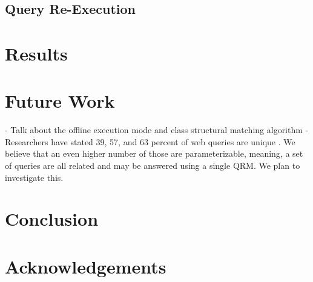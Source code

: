 \documentclass{www2010-submission}
\begin{document}


\subsection{Query Re-Execution}


\section{Results}

\section{Future Work}
- Talk about the offline execution mode and class structural matching algorithm
- Researchers have stated 39, 57, and 63 percent of web queries are unique \cite{1277770,331405,621942}.  We believe that an even higher number of those are parameterizable, meaning, a set of queries are all related and may be answered using a single QRM.  We plan to investigate this.


\section{Conclusion}

\section{Acknowledgements}


%

\end{document}
